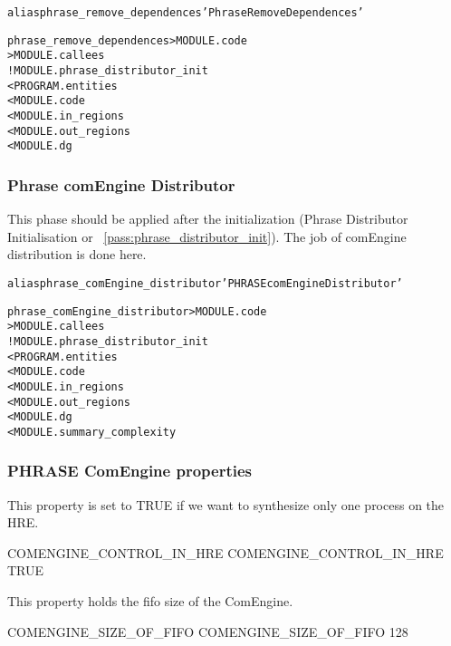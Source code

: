\documentclass[a4paper]{report}
\newenvironment{PipsMake}{\begin{alltt}}{\end{alltt}}
\newcommand{\PipsPassRef}[1]{\texttt{\detokenize{#1}}~\ref{pass:#1}}
\newenvironment{PipsPass}[1]{\label{pass:#1}}{}
\begin{document}
\begin{PipsMake}
alias phrase_remove_dependences 'Phrase Remove Dependences'

phrase_remove_dependences                      > MODULE.code
                                               > MODULE.callees
        ! MODULE.phrase_distributor_init
        < PROGRAM.entities
        < MODULE.code
        < MODULE.in_regions
        < MODULE.out_regions
        < MODULE.dg
\end{PipsMake}


\subsubsection{Phrase comEngine Distributor}

\begin{PipsPass}{phrase_comEngine_distributor}
This phase should be applied after the initialization (Phrase Distributor
Initialisation or \PipsPassRef{phrase_distributor_init}). The job of comEngine
distribution is done here.
\end{PipsPass}

\begin{PipsMake}
alias phrase_comEngine_distributor 'PHRASE comEngine Distributor'

phrase_comEngine_distributor                       > MODULE.code
                                                   > MODULE.callees
        ! MODULE.phrase_distributor_init
        < PROGRAM.entities
        < MODULE.code
        < MODULE.in_regions
        < MODULE.out_regions
        < MODULE.dg
        < MODULE.summary_complexity
\end{PipsMake}

\subsubsection{PHRASE ComEngine properties}

This property is set to TRUE if we want to synthesize only one
process on the HRE.
\begin{PipsProp}{COMENGINE_CONTROL_IN_HRE}
COMENGINE_CONTROL_IN_HRE TRUE
\end{PipsProp}

This property holds the fifo size of the ComEngine.
\begin{PipsProp}{COMENGINE_SIZE_OF_FIFO}
COMENGINE_SIZE_OF_FIFO 128
\end{PipsProp}

%
\end{document}
